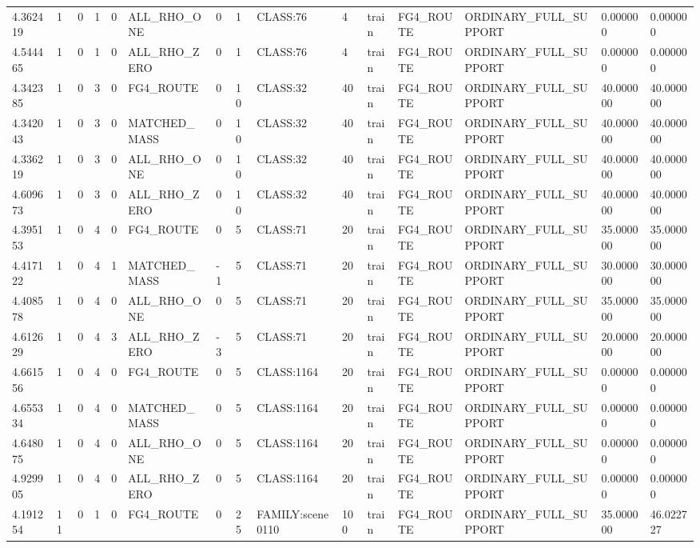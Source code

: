 \begin{tabular}{lllllllllllllll}
4.362419 & 1 & 0 & 1 & 0 & ALL\_RHO\_ONE & 0 & 1 & CLASS:76 & 4 & train & FG4\_ROUTE & ORDINARY\_FULL\_SUPPORT & 0.000000 & 0.000000 \\
4.544465 & 1 & 0 & 1 & 0 & ALL\_RHO\_ZERO & 0 & 1 & CLASS:76 & 4 & train & FG4\_ROUTE & ORDINARY\_FULL\_SUPPORT & 0.000000 & 0.000000 \\
4.342385 & 1 & 0 & 3 & 0 & FG4\_ROUTE & 0 & 10 & CLASS:32 & 40 & train & FG4\_ROUTE & ORDINARY\_FULL\_SUPPORT & 40.000000 & 40.000000 \\
4.342043 & 1 & 0 & 3 & 0 & MATCHED\_MASS & 0 & 10 & CLASS:32 & 40 & train & FG4\_ROUTE & ORDINARY\_FULL\_SUPPORT & 40.000000 & 40.000000 \\
4.336219 & 1 & 0 & 3 & 0 & ALL\_RHO\_ONE & 0 & 10 & CLASS:32 & 40 & train & FG4\_ROUTE & ORDINARY\_FULL\_SUPPORT & 40.000000 & 40.000000 \\
4.609673 & 1 & 0 & 3 & 0 & ALL\_RHO\_ZERO & 0 & 10 & CLASS:32 & 40 & train & FG4\_ROUTE & ORDINARY\_FULL\_SUPPORT & 40.000000 & 40.000000 \\
4.395153 & 1 & 0 & 4 & 0 & FG4\_ROUTE & 0 & 5 & CLASS:71 & 20 & train & FG4\_ROUTE & ORDINARY\_FULL\_SUPPORT & 35.000000 & 35.000000 \\
4.417122 & 1 & 0 & 4 & 1 & MATCHED\_MASS & -1 & 5 & CLASS:71 & 20 & train & FG4\_ROUTE & ORDINARY\_FULL\_SUPPORT & 30.000000 & 30.000000 \\
4.408578 & 1 & 0 & 4 & 0 & ALL\_RHO\_ONE & 0 & 5 & CLASS:71 & 20 & train & FG4\_ROUTE & ORDINARY\_FULL\_SUPPORT & 35.000000 & 35.000000 \\
4.612629 & 1 & 0 & 4 & 3 & ALL\_RHO\_ZERO & -3 & 5 & CLASS:71 & 20 & train & FG4\_ROUTE & ORDINARY\_FULL\_SUPPORT & 20.000000 & 20.000000 \\
4.661556 & 1 & 0 & 4 & 0 & FG4\_ROUTE & 0 & 5 & CLASS:1164 & 20 & train & FG4\_ROUTE & ORDINARY\_FULL\_SUPPORT & 0.000000 & 0.000000 \\
4.655334 & 1 & 0 & 4 & 0 & MATCHED\_MASS & 0 & 5 & CLASS:1164 & 20 & train & FG4\_ROUTE & ORDINARY\_FULL\_SUPPORT & 0.000000 & 0.000000 \\
4.648075 & 1 & 0 & 4 & 0 & ALL\_RHO\_ONE & 0 & 5 & CLASS:1164 & 20 & train & FG4\_ROUTE & ORDINARY\_FULL\_SUPPORT & 0.000000 & 0.000000 \\
4.929905 & 1 & 0 & 4 & 0 & ALL\_RHO\_ZERO & 0 & 5 & CLASS:1164 & 20 & train & FG4\_ROUTE & ORDINARY\_FULL\_SUPPORT & 0.000000 & 0.000000 \\
4.191254 & 11 & 0 & 1 & 0 & FG4\_ROUTE & 0 & 25 & FAMILY:scene0110 & 100 & train & FG4\_ROUTE & ORDINARY\_FULL\_SUPPORT & 35.000000 & 46.022727 \\

\end{tabular}
